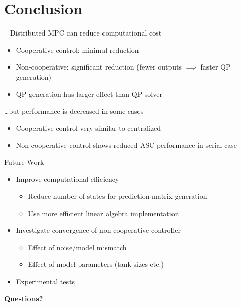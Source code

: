 \section{Conclusion}
\printsectiontitletrue
\begin{frame}{~}
    Distributed MPC can \alert{reduce computational cost}\\
      \begin{itemize}
        \item Cooperative control: minimal reduction
        \item Non-cooperative: significant reduction (fewer outputs $\implies$ faster QP generation)
        \item QP generation has larger effect than QP solver
      \end{itemize}
      \vfill

    \ldots but \alert{performance is decreased} in some cases\\
      \begin{itemize}
        \item Cooperative control very similar to centralized
        \item Non-cooperative control shows reduced ASC performance in serial case
      \end{itemize}
\end{frame}

\printsectiontitletrue
\begin{frame}{Future Work}
  \begin{itemize}
    \item Improve computational efficiency
      \begin{itemize}
        \item Reduce number of states for prediction matrix generation
        \item Use more efficient linear algebra implementation
      \end{itemize}
    \item Investigate convergence of non-cooperative controller
      \begin{itemize}
        \item Effect of noise/model mismatch
        \item Effect of model parameters (tank sizes etc.)
      \end{itemize}
    \item Experimental tests
  \end{itemize}
\end{frame}

\begin{frame}[plain]{}
  \centering\LARGE\bfseries
  Questions?
\end{frame}
